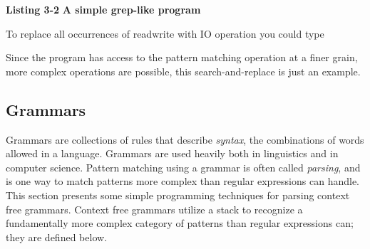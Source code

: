\bigskip

{\sffamily\bfseries Listing 3-2}
{\sffamily\bfseries A simple grep-like program}


To replace all occurrences of
{\textquotedbl}read{\textbar}write{\textquotedbl} with
{\textquotedbl}IO operation{\textquotedbl} you could type 


Since the program has access to the pattern matching operation at a
finer grain, more complex operations are possible, this
search-and-replace is just an example.

\subsection{Grammars}
Grammars are collections of rules that describe
\textit{syntax}, the combinations of words allowed in a
language. Grammars are used heavily both in linguistics and in computer
science. Pattern matching using a grammar is
often called \textit{parsing}, and is one way to match
patterns more complex than regular expressions can handle. This section
presents some simple programming techniques for parsing context free
grammars. Context free grammars utilize a stack to
recognize a fundamentally more complex category of patterns than
regular expressions can; they are defined below.

